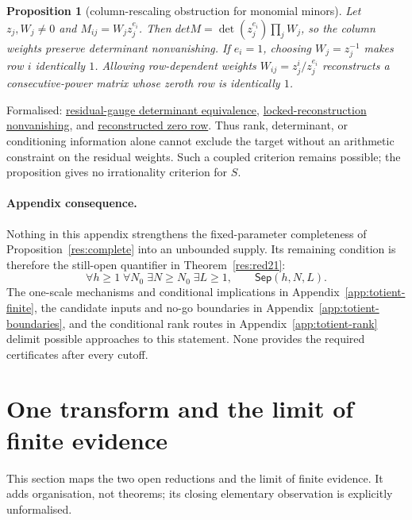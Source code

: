 \documentclass[11pt]{article}
\newcommand{\commit}{bb4e24651b37cd096d3749ef299c3317930b3a3b}
\newcommand{\repobase}{https://github.com/wcook04/plectis-lean-erdos249-257/blob/\commit}
\newcommand{\PK}{Erdos249257}
\newcommand{\lword}[4]{\href{\repobase/\PK/#1\#L#2}{#4}}
\newtheorem{proposition}[theorem]{Proposition}
\theoremstyle{definition}
\theoremstyle{remark}
\begin{document}
{\begin{proposition}[column-rescaling obstruction for monomial minors]\label{res:residualgauge}
Let $z_j,W_j\ne0$ and $M_{ij}=W_jz_j^{e_i}$.  Then
\(det M=\det(z_j^{e_i})\prod_jW_j\), so the column weights preserve
determinant nonvanishing.  If $e_i=1$, choosing $W_j=z_j^{-1}$ makes row $i$
identically $1$.  Allowing row-dependent weights
$W_{ij}=z_j^i/z_j^{e_i}$ reconstructs a consecutive-power matrix whose
zeroth row is identically $1$.
\end{proposition}
\noindent Formalised:
\lword{ResidualGaugeObstruction.lean}{55}{det_residualMonomialMatrix_ne_zero_iff}{residual-gauge determinant equivalence},
\lword{ResidualGaugeObstruction.lean}{94}{locked_reconstruction_preserves_nonzero_minor}{locked-reconstruction nonvanishing}, and
\lword{ResidualGaugeObstruction.lean}{145}{rowReconstruction_zero_row_one}{reconstructed zero row}.
Thus rank, determinant, or conditioning information alone cannot exclude the
target without an arithmetic constraint on the residual weights.  Such a
coupled criterion remains possible; the proposition gives no irrationality
criterion for $S$.

\paragraph{Appendix consequence.}
Nothing in this appendix strengthens the fixed-parameter completeness of
Proposition~\ref{res:complete} into an unbounded supply.  Its remaining condition is
therefore the still-open quantifier in Theorem~\ref{res:red21}:
\[
 \forall h\geq1\;\forall N_0\;\exists N\geq N_0\;\exists L\geq1,\qquad
 \mathsf{Sep}(h,N,L).
\]
The one-scale mechanisms and conditional implications in
Appendix~\ref{app:totient-finite}, the candidate inputs and no-go boundaries
in Appendix~\ref{app:totient-boundaries}, and the conditional rank routes in
Appendix~\ref{app:totient-rank} delimit possible approaches to this
statement.  None provides the required certificates after every cutoff.

}

\section{One transform and the limit of finite evidence}
\label{sec:architecture}

\noindent This section maps the two open reductions and the limit of finite
evidence.  It adds organisation, not theorems; its closing elementary
observation is explicitly unformalised.
\end{document}
